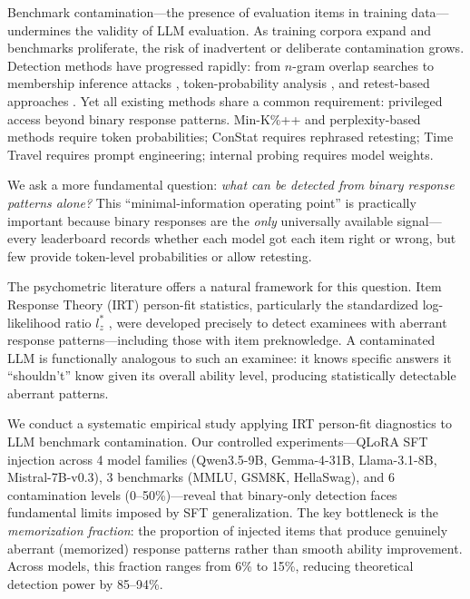\documentclass[11pt]{article}
\begin{document}
Benchmark contamination---the presence of evaluation items in training data---undermines the validity of LLM evaluation. As training corpora expand and benchmarks proliferate, the risk of inadvertent or deliberate contamination grows. Detection methods have progressed rapidly: from $n$-gram overlap searches \citep{brown2020language} to membership inference attacks \citep{shi2024detecting}, token-probability analysis \citep{oren2024proving}, and retest-based approaches \citep{dekoninck2024constat}. Yet all existing methods share a common requirement: privileged access beyond binary response patterns. Min-K\%++ and perplexity-based methods require token probabilities; ConStat requires rephrased retesting; Time Travel requires prompt engineering; internal probing requires model weights.

We ask a more fundamental question: \emph{what can be detected from binary response patterns alone?} This ``minimal-information operating point'' is practically important because binary responses are the \emph{only} universally available signal---every leaderboard records whether each model got each item right or wrong, but few provide token-level probabilities or allow retesting.

The psychometric literature offers a natural framework for this question. Item Response Theory (IRT) person-fit statistics, particularly the standardized log-likelihood ratio $l_z^*$ \citep{drasgow1985appropriateness}, were developed precisely to detect examinees with aberrant response patterns---including those with item preknowledge. A contaminated LLM is functionally analogous to such an examinee: it knows specific answers it ``shouldn't'' know given its overall ability level, producing statistically detectable aberrant patterns.

We conduct a systematic empirical study applying IRT person-fit diagnostics to LLM benchmark contamination. Our controlled experiments---QLoRA SFT injection across 4 model families (Qwen3.5-9B, Gemma-4-31B, Llama-3.1-8B, Mistral-7B-v0.3), 3 benchmarks (MMLU, GSM8K, HellaSwag), and 6 contamination levels (0--50\%)---reveal that binary-only detection faces fundamental limits imposed by SFT generalization. The key bottleneck is the \emph{memorization fraction}: the proportion of injected items that produce genuinely aberrant (memorized) response patterns rather than smooth ability improvement. Across models, this fraction ranges from 6\% to 15\%, reducing theoretical detection power by 85--94\%.
\end{document}
